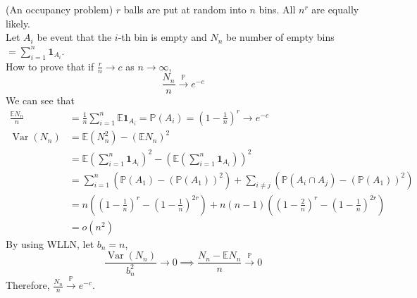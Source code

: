 \documentclass{huhtakm-template-book}
\newcommand{\prob}{\mathbb{P}}
\newcommand{\expect}{\mathbb{E}}
\DeclareMathOperator{\Var}{Var}
\begin{document}
\begin{eg}(An occupancy problem)
    $r$ balls are put at random into $n$ bins. All $n^{r}$ are equally likely.\\
    Let $A_{i}$ be event that the $i$-th bin is empty and $N_{n}$ be number of empty bins $=\sum_{i=1}^{n}\mathbf{1}_{A_{i}}$.\\
    How to prove that if $\frac{r}{n}\to c$ as $n\to\infty$,
    \begin{equation*}
        \frac{N_{n}}{n}\xrightarrow{\prob}e^{-c}
    \end{equation*}
    We can see that
    \begin{align*}
        \frac{\expect N_{n}}{n}&=\frac{1}{n}\sum_{i=1}^{n}\expect\mathbf{1}_{A_{i}}=\prob(A_{i})=\left(1-\frac{1}{n}\right)^{r}\to e^{-c}\\
        \Var(N_{n})&=\expect(N_{n}^{2})-(\expect N_{n})^{2}\\
        &=\expect\left(\sum_{i=1}^{n}\mathbf{1}_{A_{i}}\right)^{2}-\left(\expect\left(\sum_{i=1}^{n}\mathbf{1}_{A_{i}}\right)\right)^{2}\\
        &=\sum_{i=1}^{n}(\prob(A_{1})-(\prob(A_{1}))^{2})+\sum_{i\neq j}(\prob(A_{i}\cap A_{j})-(\prob(A_{1}))^{2})\\
        &=n\left(\left(1-\frac{1}{n}\right)^{r}-\left(1-\frac{1}{n}\right)^{2r}\right)+n(n-1)\left(\left(1-\frac{2}{n}\right)^{r}-\left(1-\frac{1}{n}\right)^{2r}\right)\\
        &=o(n^{2})
    \end{align*}
    By using WLLN, let $b_{n}=n$,
    \begin{equation*}
        \frac{\Var(N_{n})}{b_{n}^{2}}\to 0\implies\frac{N_{n}-\expect N_{n}}{n}\xrightarrow{\prob}0
    \end{equation*}
    Therefore, $\frac{N_{n}}{n}\xrightarrow{\prob}e^{-c}$.
\end{eg}

\newpage
\end{document}
